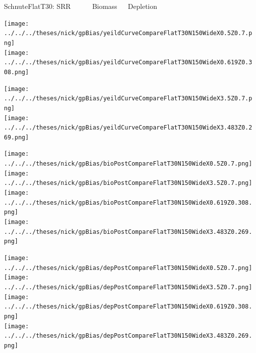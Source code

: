 \documentclass[ xcolor = pdftex, dvipsnames, table ]{beamer}
\begin{document}
%
\begin{frame}{SchnuteFlatT30: SRR $~~~~~~~~~~~$ Biomass $~~~~$ Depletion}
$~$
\hspace*{-1.25cm}
\begin{minipage}[h!]{0.25\textwidth}
\texttt{[image: ../../../theses/nick/gpBias/yeildCurveCompareFlatT30N150WideX0.5Z0.7.png]}\\
\texttt{[image: ../../../theses/nick/gpBias/yeildCurveCompareFlatT30N150WideX0.619Z0.308.png]}
\end{minipage}
\begin{minipage}[h!]{0.25\textwidth}
\hspace*{0.45cm}
\texttt{[image: ../../../theses/nick/gpBias/yeildCurveCompareFlatT30N150WideX3.5Z0.7.png]}\\
\hspace*{0.45cm}
\texttt{[image: ../../../theses/nick/gpBias/yeildCurveCompareFlatT30N150WideX3.483Z0.269.png]}
\end{minipage}
\begin{minipage}[h!]{0.25\textwidth}
\vspace{-0.1cm}
\hspace*{1.5cm}
\texttt{[image: ../../../theses/nick/gpBias/bioPostCompareFlatT30N150WideX0.5Z0.7.png]}\\
\hspace*{1.5cm}
\texttt{[image: ../../../theses/nick/gpBias/bioPostCompareFlatT30N150WideX3.5Z0.7.png]}\\
\hspace*{1.5cm}
\texttt{[image: ../../../theses/nick/gpBias/bioPostCompareFlatT30N150WideX0.619Z0.308.png]}\\
\hspace*{1.5cm}
\texttt{[image: ../../../theses/nick/gpBias/bioPostCompareFlatT30N150WideX3.483Z0.269.png]}
\end{minipage}
\begin{minipage}[h!]{0.25\textwidth}
\vspace{-0.1cm}
\hspace*{1.5cm}
\texttt{[image: ../../../theses/nick/gpBias/depPostCompareFlatT30N150WideX0.5Z0.7.png]}\\
\hspace*{1.5cm}
\texttt{[image: ../../../theses/nick/gpBias/depPostCompareFlatT30N150WideX3.5Z0.7.png]}\\
\hspace*{1.5cm}
\texttt{[image: ../../../theses/nick/gpBias/depPostCompareFlatT30N150WideX0.619Z0.308.png]}\\
\hspace*{1.5cm}
\texttt{[image: ../../../theses/nick/gpBias/depPostCompareFlatT30N150WideX3.483Z0.269.png]}
\end{minipage}
\end{frame}
\end{document}
